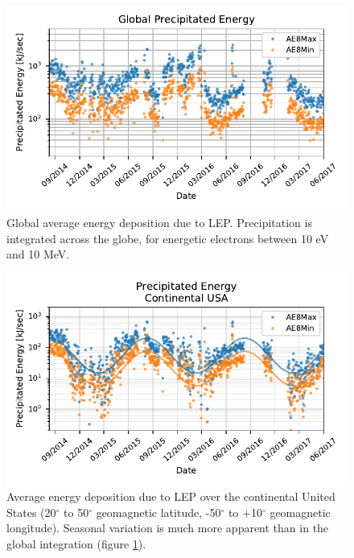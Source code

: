 \begin{figure}[ht]
\begin{center}
\includegraphics{figures/seasonal_precip_rates_global.pdf}
\caption[Global energy deposition due to LEP]{Global average energy deposition due to LEP. Precipitation is integrated across the globe, for energetic electrons between 10 eV and 10 MeV.}
\label{fig:seasonal_precip_rates_global}
\end{center}
\end{figure}
\begin{figure}[h]
\begin{center}
\includegraphics{figures/seasonal_precip_rates_US_only.pdf}
\caption[Global energy deposition due to LEP over the continental United States]{Average energy deposition due to LEP over the continental United States (20$^\circ$ to 50$^\circ$ geomagnetic latitude, -50$^\circ$ to +10$^\circ$ geomagnetic longitude). Seasonal variation is much more apparent than in the global integration (figure \ref{fig:seasonal_precip_rates_global}).}
\label{fig:seasonal_precip_rates_US_only}
\end{center}
\end{figure}

